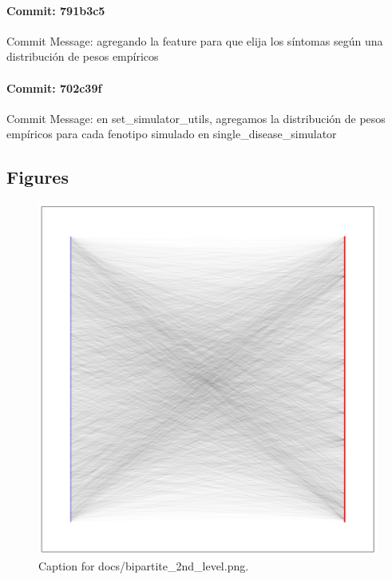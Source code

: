 \documentclass{article}
\begin{document}
\paragraph{Commit: 791b3c5}
Commit Message: agregando la feature para que elija los síntomas según una distribución de pesos empíricos

\paragraph{Commit: 702c39f}
Commit Message: en set_simulator_utils, agregamos la distribución de pesos empíricos para cada fenotipo simulado en single_disease_simulator

\subsection{Figures}
\begin{figure}[h] \centering \includegraphics{docs/bipartite_2nd_level.png} \caption{Caption for docs/bipartite_2nd_level.png.} \end{figure}
\end{document}
